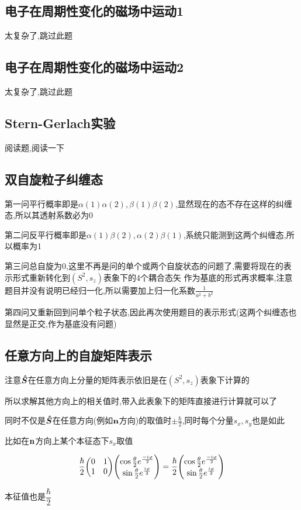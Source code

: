 \documentclass{article}
\begin{document}
        
        \subsection{电子在周期性变化的磁场中运动1}
            太复杂了,跳过此题

        \subsection{电子在周期性变化的磁场中运动2}
            太复杂了,跳过此题
        \subsection{Stern-Gerlach实验}
            阅读题,阅读一下

        \subsection{双自旋粒子纠缠态}
            第一问平行概率即是$\alpha(1)\alpha(2),\beta(1)\beta(2)$,显然现在的态不存在这样的纠缠态,所以其透射系数必为0
        
            第二问反平行概率即是$\alpha(1)\beta(2),\alpha(2)\beta(1)$,系统只能测到这两个纠缠态,所以概率为1

            第三问总自旋为0,这里不再是问的单个或两个自旋状态的问题了,需要将现在的表示形式重新转化到$(S^{2},s_{z})$表象下的4个耦合态矢
            作为基底的形式再求概率,注意题目并没有说明已经归一化,所以需要加上归一化系数$\frac{1}{a^{2}+b^{2}}$

            第四问又重新回到问单个粒子状态,因此再次使用题目的表示形式(这两个纠缠态也显然是正交,作为基底没有问题)

        \subsection{任意方向上的自旋矩阵表示}
            \begin{formal}
                注意$\vu*{S}$在任意方向上分量的矩阵表示依旧是在$(S^{2},s_{z})$表象下计算的
                
                所以求解其他方向上的相关值时,带入此表象下的矩阵直接进行计算就可以了

                同时不仅是$\vu*{S}$在任意方向(例如$\vb{n}$方向)的取值时$\pm \frac{\hbar}{2}$,同时每个分量$s_{x},s_{y}$也是如此

                比如在$\vb{n}$方向上某个本征态下$s_{x}$取值

                $$
                \frac{\hbar}{2} \mqty( 0 & 1 \\ 1 & 0) 
                \mqty( \cos{\frac{\theta}{2}}e^{\frac{-i\varphi}{2}} \\ \sin{\frac{\theta}{2}}e^{\frac{i\varphi}{2}} ) = 
                \frac{\hbar}{2} \mqty( \cos{\frac{\theta}{2}}e^{\frac{-i\varphi}{2}} \\ \sin{\frac{\theta}{2}}e^{\frac{i\varphi}{2}} )
                $$

                本征值也是$\dfrac{\hbar}{2}$

            \end{formal}
\end{document}
